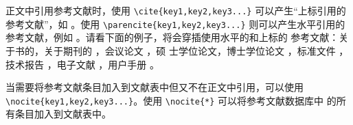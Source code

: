 正文中引用参考文献时，使用 \verb|\cite{key1,key2,key3...}| 可以产生“上标引用的
参考文献”，如 \cite{Meta_CN,chen2007act,DPMG}。使用
\verb|\parencite{key1,key2,key3...}| 则可以产生水平引用的参考文献，例如
\parencite{JohnD,zhubajie,IEEE-1363}。请看下面的例子，将会穿插使用水平的和上标的
参考文献：关于书的\parencite{Meta_CN,JohnD,IEEE-1363}，关于期刊的
\cite{chen2007act,chen2007ewi}，会议论文 \parencite{DPMG,kocher99,cnproceed}，硕
士学位论文\parencite{zhubajie,metamori2004}，博士学位论文
\cite{shaheshang,FistSystem01,bai2008}，标准文件 \parencite{IEEE-1363}，技术报告
\cite{NPB2}，电子文献 \parencite{xiaoyu2001, CHRISTINE1998}，用户手册
\parencite{RManual}。

当需要将参考文献条目加入到文献表中但又不在正文中引用，可以使用
\verb|\nocite{key1,key2,key3...}|。使用 \verb|\nocite{*}| 可以将参考文献数据库中
的所有条目加入到文献表中。

